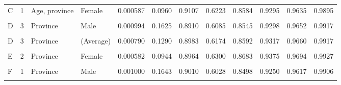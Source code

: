 \documentclass[
]{report}
\begin{document}
\begin{table}[!h]
\begin{tabular}[t]{llllrrrrrrrr}
C & 1 & Age, province & Female & 0.000587 & 0.0960 & 0.9107 & 0.6223 & 0.8584 & 0.9295 & 0.9635 & 0.9895\\
\cellcolor{gray!6}{C} & \cellcolor{gray!6}{1} & \cellcolor{gray!6}{Age, province} & \cellcolor{gray!6}{(Average)} & \cellcolor{gray!6}{0.000789} & \cellcolor{gray!6}{0.1287} & \cellcolor{gray!6}{0.8978} & \cellcolor{gray!6}{0.6151} & \cellcolor{gray!6}{0.8565} & \cellcolor{gray!6}{0.9288} & \cellcolor{gray!6}{0.9637} & \cellcolor{gray!6}{0.9903}\\
D & 3 & Province & Male & 0.000994 & 0.1625 & 0.8910 & 0.6085 & 0.8545 & 0.9298 & 0.9652 & 0.9917\\
\addlinespace
\cellcolor{gray!6}{D} & \cellcolor{gray!6}{3} & \cellcolor{gray!6}{Province} & \cellcolor{gray!6}{Female} & \cellcolor{gray!6}{0.000585} & \cellcolor{gray!6}{0.0954} & \cellcolor{gray!6}{0.9056} & \cellcolor{gray!6}{0.6263} & \cellcolor{gray!6}{0.8639} & \cellcolor{gray!6}{0.9335} & \cellcolor{gray!6}{0.9668} & \cellcolor{gray!6}{0.9916}\\
D & 3 & Province & (Average) & 0.000790 & 0.1290 & 0.8983 & 0.6174 & 0.8592 & 0.9317 & 0.9660 & 0.9917\\
\cellcolor{gray!6}{E} & \cellcolor{gray!6}{2} & \cellcolor{gray!6}{Province} & \cellcolor{gray!6}{Male} & \cellcolor{gray!6}{0.000995} & \cellcolor{gray!6}{0.1626} & \cellcolor{gray!6}{0.8915} & \cellcolor{gray!6}{0.6067} & \cellcolor{gray!6}{0.8531} & \cellcolor{gray!6}{0.9283} & \cellcolor{gray!6}{0.9640} & \cellcolor{gray!6}{0.9914}\\
E & 2 & Province & Female & 0.000582 & 0.0944 & 0.8964 & 0.6300 & 0.8683 & 0.9375 & 0.9694 & 0.9927\\
\cellcolor{gray!6}{E} & \cellcolor{gray!6}{2} & \cellcolor{gray!6}{Province} & \cellcolor{gray!6}{(Average)} & \cellcolor{gray!6}{0.000788} & \cellcolor{gray!6}{0.1285} & \cellcolor{gray!6}{0.8939} & \cellcolor{gray!6}{0.6184} & \cellcolor{gray!6}{0.8607} & \cellcolor{gray!6}{0.9329} & \cellcolor{gray!6}{0.9667} & \cellcolor{gray!6}{0.9921}\\
\addlinespace
F & 1 & Province & Male & 0.001000 & 0.1643 & 0.9010 & 0.6028 & 0.8498 & 0.9250 & 0.9617 & 0.9906\\
\cellcolor{gray!6}{F} & \cellcolor{gray!6}{1} & \cellcolor{gray!6}{Province} & \cellcolor{gray!6}{Female} & \cellcolor{gray!6}{0.000595} & \cellcolor{gray!6}{0.0985} & \cellcolor{gray!6}{0.9353} & \cellcolor{gray!6}{0.6246} & \cellcolor{gray!6}{0.8624} & \cellcolor{gray!6}{0.9327} & \cellcolor{gray!6}{0.9662} & \cellcolor{gray!6}{0.9913}\\

\end{tabular}
\end{table}
\end{document}
